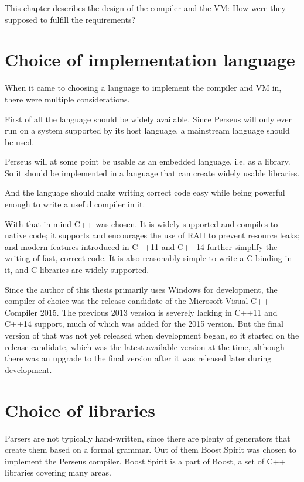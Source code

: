 	This chapter describes the design of the compiler and the VM: How were they supposed to fulfill the requirements?

	\section{Choice of implementation language}
	
		When it came to choosing a language to implement the compiler and VM in, there were multiple considerations.
		
		First of all the language should be widely available. Since Perseus will only ever run on a system supported by its host language, a mainstream language should be used.
		
		Perseus will at some point be usable as an embedded language, i.e. as a library. So it should be implemented in a language that can create widely usable libraries.
		
		And the language should make writing correct code easy while being powerful enough to write a useful compiler in it.
		
		With that in mind C++ was chosen. It is widely supported and compiles to native code; it supports and encourages the use of RAII to prevent resource leaks; and modern features introduced in C++11 and C++14 further simplify the writing of fast, correct code\cite{effective-modern-cpp}. It is also reasonably simple to write a C binding in it, and C libraries are widely supported.
		
		Since the author of this thesis primarily uses Windows for development, the compiler of choice was the release candidate of the Microsoft Visual C++ Compiler 2015. The previous 2013 version is severely lacking in C++11 and C++14 support, much of which was added for the 2015 version. But the final version of that was not yet released when development began, so it started on the release candidate, which was the latest available version at the time, although there was an upgrade to the final version after it was released later during development.
	
	\section{Choice of libraries}
	
		Parsers are not typically hand-written, since there are plenty of generators that create them based on a formal grammar. Out of them Boost.Spirit was chosen to implement the Perseus compiler. Boost.Spirit is a part of Boost, a set of C++ libraries covering many areas.
		
